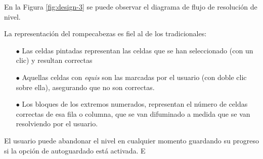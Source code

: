 En la Figura \ref{fig:design-3} se puede observar el diagrama de flujo de resolución
de nivel. 

La representación del rompecabezas es fiel al de los tradicionales:

\begin{itemize}
  \item[$\bullet$] Las celdas pintadas representan las celdas que se han seleccionado (con un clic) y
  resultan correctas
  \item[$\bullet$] Aquellas celdas con \textit{equis} son las marcadas  por el
  usuario (con doble clic sobre ella), asegurando que no son correctas.
  \item[$\bullet$] Los bloques de los extremos numerados, representan el número
  de celdas correctas de esa fila o columna, que se van difuminado a medida que se van
  resolviendo por el usuario.
\end{itemize}

El usuario puede abandonar el nivel en cualquier momento guardando su progreso si
la opción de autoguardado está activada. E 